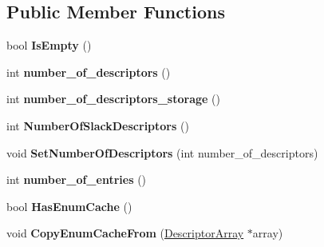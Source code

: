 \subsection*{Public Member Functions}
\begin{DoxyCompactItemize}
\item 
\hypertarget{classv8_1_1internal_1_1_descriptor_array_a93a755f37dc42fc8f2f8938680d16966}{}bool {\bfseries Is\+Empty} ()\label{classv8_1_1internal_1_1_descriptor_array_a93a755f37dc42fc8f2f8938680d16966}

\item 
\hypertarget{classv8_1_1internal_1_1_descriptor_array_af3ee66fb355520b97356bf38834c7ce3}{}int {\bfseries number\+\_\+of\+\_\+descriptors} ()\label{classv8_1_1internal_1_1_descriptor_array_af3ee66fb355520b97356bf38834c7ce3}

\item 
\hypertarget{classv8_1_1internal_1_1_descriptor_array_aa6e4fbd791916a444b31516bbc92b4b1}{}int {\bfseries number\+\_\+of\+\_\+descriptors\+\_\+storage} ()\label{classv8_1_1internal_1_1_descriptor_array_aa6e4fbd791916a444b31516bbc92b4b1}

\item 
\hypertarget{classv8_1_1internal_1_1_descriptor_array_adbef2e580eec6a97c9b1ac293f33cc6b}{}int {\bfseries Number\+Of\+Slack\+Descriptors} ()\label{classv8_1_1internal_1_1_descriptor_array_adbef2e580eec6a97c9b1ac293f33cc6b}

\item 
\hypertarget{classv8_1_1internal_1_1_descriptor_array_a81fde9ba08db81204710253378cf7966}{}void {\bfseries Set\+Number\+Of\+Descriptors} (int number\+\_\+of\+\_\+descriptors)\label{classv8_1_1internal_1_1_descriptor_array_a81fde9ba08db81204710253378cf7966}

\item 
\hypertarget{classv8_1_1internal_1_1_descriptor_array_a5199aeed899ac434631be78f47c1788d}{}int {\bfseries number\+\_\+of\+\_\+entries} ()\label{classv8_1_1internal_1_1_descriptor_array_a5199aeed899ac434631be78f47c1788d}

\item 
\hypertarget{classv8_1_1internal_1_1_descriptor_array_a84574d4917be57101999d94f040c0d57}{}bool {\bfseries Has\+Enum\+Cache} ()\label{classv8_1_1internal_1_1_descriptor_array_a84574d4917be57101999d94f040c0d57}

\item 
\hypertarget{classv8_1_1internal_1_1_descriptor_array_a09154797491f69013d2318dd2ef5d1fc}{}void {\bfseries Copy\+Enum\+Cache\+From} (\hyperlink{classv8_1_1internal_1_1_descriptor_array}{Descriptor\+Array} $\ast$array)\label{classv8_1_1internal_1_1_descriptor_array_a09154797491f69013d2318dd2ef5d1fc}


\end{DoxyCompactItemize}
